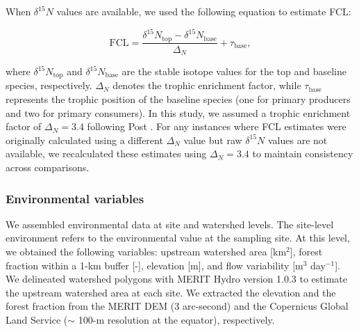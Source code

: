 \documentclass[11pt, class=article, crop=false]{standalone}
\begin{document}
When $\delta^{15}N$ values are available, we used the following equation to estimate FCL:

\begin{equation}
    \mbox{FCL} = \frac{\delta^{15}N_{\text{top}} - \delta^{15}N_{\text{base}}}{\Delta_N} + \tau_{\text{base}},
    \label{eq:fcl-si}
\end{equation}

where $\delta^{15}N_{\text{top}}$ and $\delta^{15}N_{\text{base}}$ are the stable isotope values for the top and baseline species, respectively.
$\Delta_{N}$ denotes the trophic enrichment factor, while $\tau_{\text{base}}$ represents the trophic position of the baseline species (one for primary producers and two for primary consumers). 
In this study, we assumed a trophic enrichment factor of $\Delta_{N} = 3.4$ following Post \citep{post_using_2002}.
For any instances where FCL estimates were originally calculated using a different $\Delta_{N}$ value but raw $\delta^{15}N$ values are not available, we recalculated these estimates using $\Delta_{N} = 3.4$ to maintain consistency across comparisons.

\subsubsection{Environmental variables}

We assembled environmental data at site and watershed levels.
The site-level environment refers to the environmental value at the sampling site.
At this level, we obtained the following variables: upstream watershed area [km$^2$], forest fraction within a 1-km buffer [-], elevation [m], and flow variability [m$^3$ day$^{-1}$].
We delineated watershed polygons with MERIT Hydro version 1.0.3 \citep{yamazaki_merit_2019} to estimate the upstream watershed area at each site.
We extracted the elevation and the forest fraction from the MERIT DEM (3 arc-second) and the Copernicus Global Land Service ($\sim$ 100-m resolution at the equator), respectively.
\end{document}
